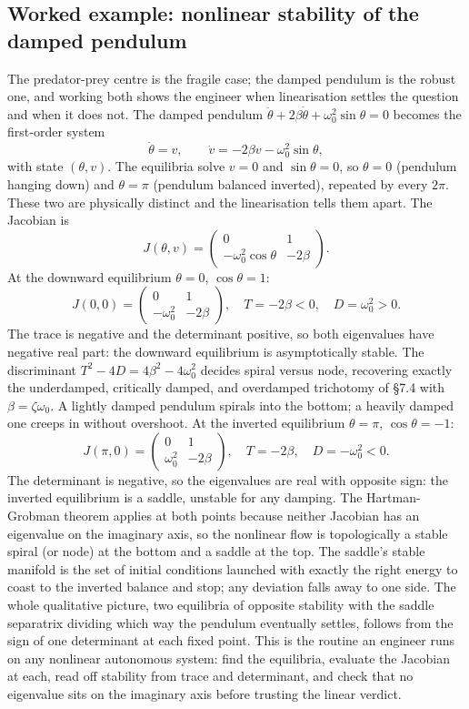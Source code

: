\subsection{Worked example: nonlinear stability of the damped pendulum}

The predator-prey centre is the fragile case; the damped pendulum is
the robust one, and working both shows the engineer when
linearisation settles the question and when it does not. The damped
pendulum $\ddot{\theta} + 2\beta\dot{\theta} + \omega_{0}^{2}
\sin\theta = 0$ becomes the first-order system
\[
\dot{\theta} = v, \qquad \dot{v} = -2\beta v - \omega_{0}^{2}
\sin\theta,
\]
with state $(\theta, v)$. The equilibria solve $v = 0$ and
$\sin\theta = 0$, so $\theta = 0$ (pendulum hanging down) and
$\theta = \pi$ (pendulum balanced inverted), repeated by every
$2\pi$. These two are physically distinct and the linearisation
tells them apart. The Jacobian is
\[
J(\theta, v) = \begin{pmatrix} 0 & 1 \\ -\omega_{0}^{2}\cos\theta &
-2\beta \end{pmatrix}.
\]
At the downward equilibrium $\theta = 0$, $\cos\theta = 1$:
\[
J(0, 0) = \begin{pmatrix} 0 & 1 \\ -\omega_{0}^{2} & -2\beta
\end{pmatrix}, \quad T = -2\beta < 0, \quad D = \omega_{0}^{2} > 0.
\]
The trace is negative and the determinant positive, so both
eigenvalues have negative real part: the downward equilibrium is
asymptotically stable. The discriminant $T^{2} - 4D = 4\beta^{2} -
4\omega_{0}^{2}$ decides spiral versus node, recovering exactly the
underdamped, critically damped, and overdamped trichotomy of \S7.4
with $\beta = \zeta\omega_{0}$. A lightly damped pendulum spirals
into the bottom; a heavily damped one creeps in without overshoot.
At the inverted equilibrium $\theta = \pi$, $\cos\theta = -1$:
\[
J(\pi, 0) = \begin{pmatrix} 0 & 1 \\ \omega_{0}^{2} & -2\beta
\end{pmatrix}, \quad T = -2\beta, \quad D = -\omega_{0}^{2} < 0.
\]
The determinant is negative, so the eigenvalues are real with
opposite sign: the inverted equilibrium is a saddle, unstable for
any damping. The Hartman-Grobman theorem applies at both points
because neither Jacobian has an eigenvalue on the imaginary axis,
so the nonlinear flow is topologically a stable spiral (or node) at
the bottom and a saddle at the top. The saddle's stable manifold is
the set of initial conditions launched with exactly the right energy
to coast to the inverted balance and stop; any deviation falls away
to one side. The whole qualitative picture, two equilibria of
opposite stability with the saddle separatrix dividing which way the
pendulum eventually settles, follows from the sign of one
determinant at each fixed point. This is the routine an engineer
runs on any nonlinear autonomous system: find the equilibria,
evaluate the Jacobian at each, read off stability from trace and
determinant, and check that no eigenvalue sits on the imaginary axis
before trusting the linear verdict.

